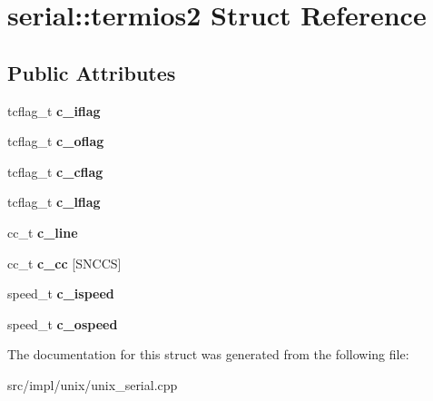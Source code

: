 \hypertarget{structserial_1_1termios2}{}\section{serial\+:\+:termios2 Struct Reference}
\label{structserial_1_1termios2}
\subsection*{Public Attributes}
\begin{DoxyCompactItemize}
\item 
tcflag\+\_\+t {\bfseries c\+\_\+iflag}\hypertarget{structserial_1_1termios2_ae6baf1fecdaf609fb72ebe3eb6a9f5df}{}\label{structserial_1_1termios2_ae6baf1fecdaf609fb72ebe3eb6a9f5df}

\item 
tcflag\+\_\+t {\bfseries c\+\_\+oflag}\hypertarget{structserial_1_1termios2_a179cf143410e65d4894b04cbf07b0fae}{}\label{structserial_1_1termios2_a179cf143410e65d4894b04cbf07b0fae}

\item 
tcflag\+\_\+t {\bfseries c\+\_\+cflag}\hypertarget{structserial_1_1termios2_a4e4ef81dbd8e793984861e7c43017501}{}\label{structserial_1_1termios2_a4e4ef81dbd8e793984861e7c43017501}

\item 
tcflag\+\_\+t {\bfseries c\+\_\+lflag}\hypertarget{structserial_1_1termios2_a21f1eeb4a15670a3aa89511d1c0d5e75}{}\label{structserial_1_1termios2_a21f1eeb4a15670a3aa89511d1c0d5e75}

\item 
cc\+\_\+t {\bfseries c\+\_\+line}\hypertarget{structserial_1_1termios2_aceccc8c95db1db715fa5aea6dae924b1}{}\label{structserial_1_1termios2_aceccc8c95db1db715fa5aea6dae924b1}

\item 
cc\+\_\+t {\bfseries c\+\_\+cc} \mbox{[}S\+N\+C\+CS\mbox{]}\hypertarget{structserial_1_1termios2_a672ff09c68b844014e24d9c046fc147c}{}\label{structserial_1_1termios2_a672ff09c68b844014e24d9c046fc147c}

\item 
speed\+\_\+t {\bfseries c\+\_\+ispeed}\hypertarget{structserial_1_1termios2_a87f2c161b7e83496ee16412e3c571b65}{}\label{structserial_1_1termios2_a87f2c161b7e83496ee16412e3c571b65}

\item 
speed\+\_\+t {\bfseries c\+\_\+ospeed}\hypertarget{structserial_1_1termios2_a995642a6dbe875dc7ca8eacd0c515098}{}\label{structserial_1_1termios2_a995642a6dbe875dc7ca8eacd0c515098}

\end{DoxyCompactItemize}


The documentation for this struct was generated from the following file\+:\begin{DoxyCompactItemize}
\item 
src/impl/unix/unix\+\_\+serial.\+cpp\end{DoxyCompactItemize}
